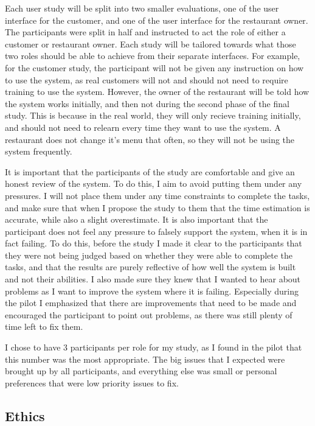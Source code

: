 Each user study will be split into two smaller evaluations, one of the user interface for the customer, and one of the user interface for the restaurant owner. The participants were split in half and instructed to act the role of either a customer or restaurant owner. Each study will be tailored towards what those two roles should be able to achieve from their separate interfaces. For example, for the customer study, the participant will not be given any instruction on how to use the system, as real customers will not and should not need to require training to use the system. However, the owner of the restaurant will be told how the system works initially, and then not during the second phase of the final study. This is because in the real world, they will only recieve training initially, and should not need to relearn every time they want to use the system. A restaurant does not change it's menu that often, so they will not be using the system frequently.

It is important that the participants of the study are comfortable and give an honest review of the system. To do this, I aim to avoid putting them under any pressures. I will not place them under any time constraints to complete the tasks, and make sure that when I propose the study to them that the time estimation is accurate, while also a slight overestimate. It is also important that the participant does not feel any pressure to falsely support the system, when it is in fact failing. To do this, before the study I made it clear to the participants that they were not being judged based on whether they were able to complete the tasks, and that the results are purely reflective of how well the system is built and not their abilities. I also made sure they knew that I wanted to hear about problems as I want to improve the system where it is failing. Especially during the pilot I emphasized that there are improvements that need to be made and encouraged the participant to point out problems, as there was still plenty of time left to fix them.

I chose to have 3 participants per role for my study, as I found in the pilot that this number was the most appropriate. The big issues that I expected were brought up by all participants, and everything else was small or personal preferences that were low priority issues to fix.

\subsection{Ethics}

